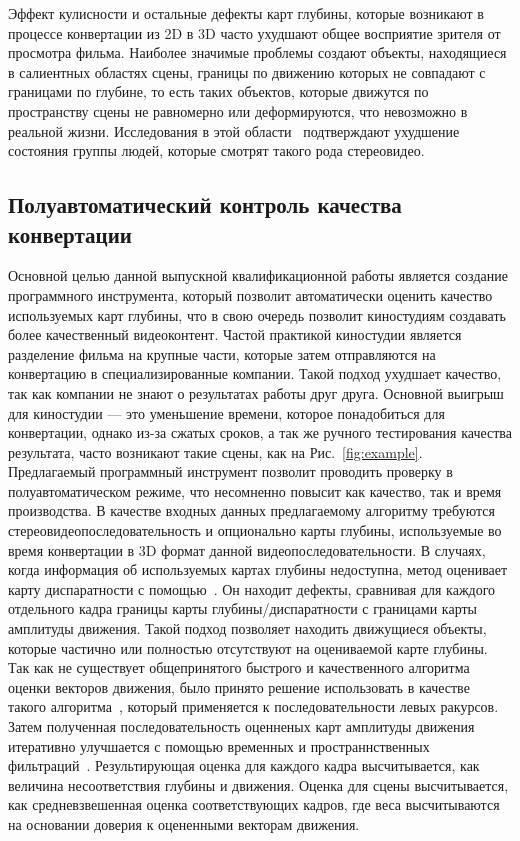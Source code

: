 \documentclass[14pt, a4paper]{extarticle}
\begin{document}
Эффект кулисности и остальные дефекты карт глубины, которые возникают в процессе 
конвертации из 2D в 3D часто ухудшают общее восприятие зрителя от просмотра фильма. 
Наиболее значимые проблемы создают объекты, находящиеся в салиентных областях 
сцены, границы по движению которых не совпадают с границами по глубине, то есть 
таких объектов, которые движутся по пространству сцены не равномерно или деформируются, 
что невозможно в реальной жизни. Исследования в этой области~\cite{jung2012visual,li2014visual} 
подтверждают ухудшение состояния группы людей, которые смотрят такого рода стереовидео.

\subsection{Полуавтоматический контроль качества конвертации}



Основной целью данной выпускной квалификационной работы 
является создание программного инструмента, 
который позволит автоматически оценить качество используемых карт глубины,
что в свою очередь позволит киностудиям создавать более качественный видеоконтент. 
Частой практикой киностудии является разделение фильма на крупные части, которые 
затем отправляются на конвертацию в специализированные компании. Такой подход 
ухудшает качество, так как компании не знают о результатах работы друг друга. 
Основной выигрыш для киностудии --- это уменьшение времени, которое понадобиться 
для конвертации, однако из-за сжатых сроков, а так же ручного тестирования 
качества результата, часто возникают такие сцены, как на Рис.~\ref{fig:example}. 
Предлагаемый программный инструмент позволит проводить проверку в полуавтоматическом 
режиме, что несомненно повысит как качество, так и время производства.
В качестве входных данных предлагаемому алгоритму требуются стереовидеопоследовательность 
и опционально карты глубины, используемые во время конвертации в 3D формат данной 
видеопоследовательности. В случаях, когда информация об используемых картах 
глубины недоступна, метод оценивает карту диспаратности с помощью~\cite{simonyan2008fast,zhang2014100+}. 
Он находит дефекты, сравнивая для каждого отдельного 
кадра границы карты глубины/диспаратности с границами карты 
амплитуды движения. Такой подход позволяет находить движущиеся объекты, которые 
частично или полностью отсутствуют на оцениваемой карте глубины. Так как не существует 
общепринятого быстрого и качественного алгоритма оценки векторов движения, было принято 
решение использовать в качестве такого алгоритма~\cite{simonyan2008fast}, который 
применяется к последовательности левых ракурсов. Затем полученная последовательность 
оценненых карт амплитуды движения итеративно улучшается с помощью временных и 
пространнственных фильтраций~\cite{fecker2007time,matyunin2011temporal,he2013guided}. 
Результирующая оценка для каждого кадра высчитывается, как величина несоответствия 
глубины и движения. Оценка для сцены высчитывается, как средневзвешенная оценка 
соответствующих кадров, где веса высчитываются на основании доверия 
к оцененными векторам движения.
\end{document}
